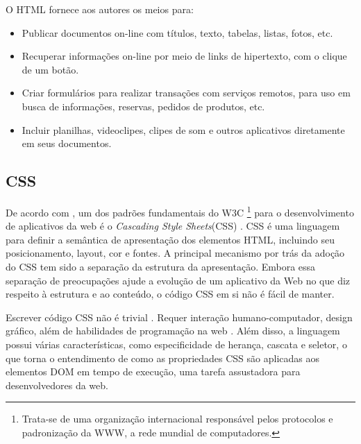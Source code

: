 O HTML fornece aos autores os meios para: 
\begin{itemize}
    \item Publicar documentos on-line com títulos, texto, tabelas, listas, fotos, etc. 
    \item Recuperar informações on-line por meio de links de hipertexto, com o clique de um botão. 
    \item Criar formulários para realizar transações com serviços remotos, para uso em busca de informações, reservas, pedidos de produtos, etc. 
    \item Incluir planilhas, videoclipes, clipes de som e outros aplicativos diretamente em seus documentos.
\end{itemize}


\subsection{CSS}
De acordo com \citeauthor{css}, um dos padrões fundamentais do W3C \footnote{Trata-se de uma organização internacional responsável pelos protocolos e padronização da WWW, a rede mundial de computadores.} para o desenvolvimento de aplicativos da web é o \textit{Cascading Style Sheets}(CSS) \cite{Casca8378199:online}. CSS é uma linguagem para definir a semântica de apresentação dos elementos HTML, incluindo seu posicionamento, layout, cor e fontes. A principal mecanismo por trás da adoção do CSS tem sido a separação da estrutura da apresentação. Embora essa separação de preocupações ajude a evolução de um aplicativo da Web no que diz respeito à estrutura e ao conteúdo, o código CSS em si não é fácil de manter.\cite{badros1999constraint}

Escrever código CSS não é trivial \cite{quint2007editing}. Requer interação humano-computador, design gráfico, além de habilidades de programação na web \cite{keller2010css}. Além disso, a linguagem possui várias características, como especificidade de herança, cascata e seletor, o que torna o entendimento de como as propriedades CSS são aplicadas aos elementos DOM em tempo de execução, uma tarefa assustadora para desenvolvedores da web.



